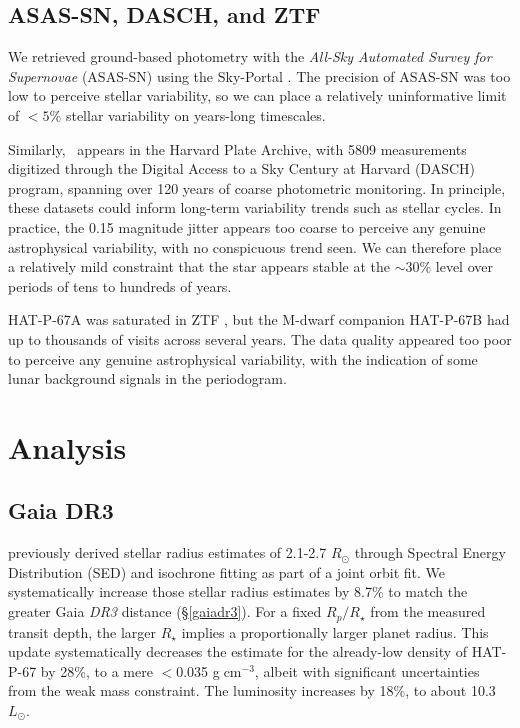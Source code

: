 \documentclass[twocolumn]{aastex631}
\newcommand{\hatp}{\object{HAT-P-67}~}
\begin{document}
\subsection{ASAS-SN, DASCH, and ZTF}
We retrieved ground-based photometry with the \emph{All-Sky Automated Survey for Supernovae} (ASAS-SN) using the Sky-Portal \citep{shappee14,2017PASP..129j4502K}.  The precision of ASAS-SN was too low to perceive stellar variability, so we can place a relatively uninformative limit of $<5\%$ stellar variability on years-long timescales.

Similarly, \hatp appears in the Harvard Plate Archive, with 5809 measurements digitized through the Digital Access to a Sky Century at Harvard (DASCH) program, spanning over 120 years of coarse photometric monitoring.  In principle, these datasets could inform long-term variability trends such as stellar cycles.  In practice, the 0.15 magnitude jitter appears too coarse to perceive any genuine astrophysical variability, with no conspicuous trend seen.  We can therefore place a relatively mild constraint that the star appears stable at the $\sim30\%$ level over periods of tens to hundreds of years.

HAT-P-67A was saturated in ZTF \citep{2019PASP..131a8002B}, but the M-dwarf companion HAT-P-67B had up to thousands of visits across several years.  The data quality appeared too poor to perceive any genuine astrophysical variability, with the indication of some lunar background signals in the periodogram.


\section{Analysis} \label{secAnalysis}

\subsection{Gaia DR3}\label{analysisgaiaDR3}
\citet{2017AJ....153..211Z} previously derived stellar radius estimates of 2.1-2.7 $R_\odot$ through Spectral Energy Distribution (SED) and isochrone fitting as part of a joint orbit fit.  We systematically increase those stellar radius estimates by 8.7\% to match the greater Gaia \emph{DR3} distance (\S \ref{gaiadr3}).  For a fixed $R_p/R_\star$ from the measured transit depth, the larger $R_\star$ implies a proportionally larger planet radius. This update systematically decreases the estimate for the already-low density of HAT-P-67 by 28\%, to a mere $<$0.035 g$\;$cm$^{-3}$, albeit with significant uncertainties from the weak mass constraint.  The luminosity increases by 18\%, to about 10.3 $L_\odot$.
\end{document}

